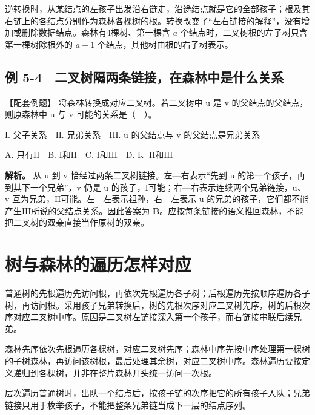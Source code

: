 逆转换时，从某结点的左孩子出发沿右链走，沿途结点就是它的全部孩子；根及其右链上的各结点分别作为森林各棵树的根。转换改变了``左右链接的解释''，没有增加或删除数据结点。森林有4棵树、第一棵含 \(a\) 个结点时，二叉树根的左子树只含第一棵树除根外的 \(a-1\) 个结点，其他树由根的右子树表示。

\subsection{例 5-4　二叉树隔两条链接，在森林中是什么关系}\label{DS05-ex4}

\begin{example}[配套案例]

【配套例题】 将森林转换成对应二叉树。若二叉树中 u 是 v 的父结点的父结点，则原森林中 u 与 v 可能的关系是（　）。

\ensuremath{\mathrm{I}}. 父子关系　\ensuremath{\mathrm{II}}. 兄弟关系　\ensuremath{\mathrm{III}}. u 的父结点与 v 的父结点是兄弟关系

A. 只有\ensuremath{\mathrm{II}}　B. \ensuremath{\mathrm{I}}和\ensuremath{\mathrm{II}}　C. \ensuremath{\mathrm{I}}和\ensuremath{\mathrm{III}}　D. \ensuremath{\mathrm{I}}、\ensuremath{\mathrm{II}}和\ensuremath{\mathrm{III}}

\end{example}

\textbf{解析。} 从 u 到 v 恰经过两条二叉树链接。左---右表示``先到 u 的第一个孩子，再到其下一个兄弟''，v 仍是 u 的孩子，\ensuremath{\mathrm{I}}可能；右—右表示连续两个兄弟链接，u、v 互为兄弟，\ensuremath{\mathrm{II}}可能。左—左表示祖孙，右—左表示 u 的兄弟的孩子，它们都不能产生\ensuremath{\mathrm{III}}所说的父结点关系。因此答案为 \textbf{B}。应按每条链接的语义推回森林，不能把二叉树的双亲直接当作原树的双亲。

\section{树与森林的遍历怎样对应}\label{DS05-08}

普通树的先根遍历先访问根，再依次先根遍历各子树；后根遍历先按顺序遍历各子树，再访问根。采用孩子兄弟转换后，树的先根次序对应二叉树先序，树的后根次序对应二叉树中序。原因是二叉树左链接深入第一个孩子，而右链接串联后续兄弟。

森林先序依次先根遍历各棵树，对应二叉树先序；森林中序先按中序处理第一棵树的子树森林，再访问该树根，最后处理其余树，对应二叉树中序。森林遍历要按定义递归到各棵树，并非在整片森林开头统一访问一次根。

层次遍历普通树时，出队一个结点后，按孩子链的次序把它的所有孩子入队；兄弟链接只用于枚举孩子，不能把整条兄弟链当成下一层的结点序列。

